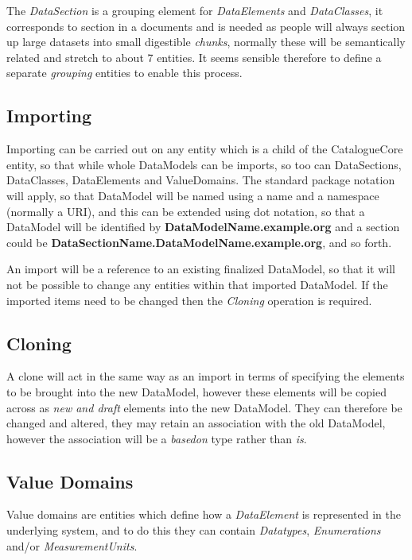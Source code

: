 \documentclass{article}
\begin{document}
The \emph{DataSection} is a grouping element for \emph{DataElements} and \emph{DataClasses}, it corresponds to section in a documents and is needed as people will always section up large datasets into small digestible \emph{chunks}, normally these will be semantically related and stretch to about 7 entities. It seems sensible therefore to define a separate \emph{grouping} entities to enable this process. 

\subsection{Importing}

Importing can be carried out on any entity which is a child of the CatalogueCore entity, so that while whole DataModels can be imports, so too can DataSections, DataClasses, DataElements and ValueDomains. The standard package notation will apply, so that DataModel will be named using a name and a namespace (normally a URI), and this can be extended using dot notation, so that a DataModel will be identified by \textbf{DataModelName.example.org} and a section could be \textbf{DataSectionName.DataModelName.example.org}, and so forth.

An import will be a reference to an existing finalized DataModel, so that it will not be possible to change any entities within that imported DataModel. If the imported items need to be changed then the \emph{Cloning} operation is required.

\subsection{Cloning}

A clone will act in the same way as an import in terms of specifying the elements to be brought into the new DataModel, however these elements will be copied across as \emph{new and draft} elements into the new DataModel. They can therefore be changed and altered, they may retain an association with the old DataModel, however the association will be a \emph{basedon} type rather than \emph{is}. 



\subsection{Value Domains}

Value domains are entities which define how a \emph{DataElement} is represented in the underlying system, and to do this they can contain \emph{Datatypes}, \emph{Enumerations} and/or \emph{MeasurementUnits}. 
\end{document}
